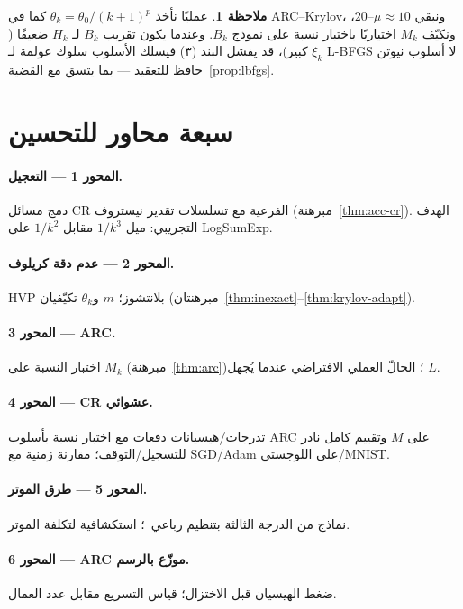 \documentclass[11pt,a4paper]{article}
\theoremstyle{plain}
\theoremstyle{definition}
\newtheorem{remark}[theorem]{ملاحظة}
\begin{document}
\begin{remark}
\label{rem:mf-qn-practice}
عمليًا نأخذ $\theta_{k}=\theta_{0}/(k+1)^{p}$ كما في ARC--Krylov، ونبقي $\mu\approx 10$--$20$، ونكيّف $M_{k}$ اختياريًا باختبار نسبة على نموذج $B_{k}$.
وعندما يكون تقريب $B_{k}$ لـ $H_{k}$ ضعيفًا ( $\xi_{k}$ كبير)، قد يفشل البند (٣) فيسلك الأسلوب سلوك عولمة لـ L-BFGS لا أسلوب نيوتن حافظ للتعقيد --- بما يتسق مع القضية~\ref{prop:lbfgs}.
\end{remark}

\section{سبعة محاور للتحسين}
\label{sec:axes}

\paragraph{المحور 1 --- التعجيل.}
دمج مسائل CR الفرعية مع تسلسلات تقدير نيستروف (مبرهنة~\ref{thm:acc-cr}). الهدف التجريبي: ميل $1/k^{3}$ مقابل $1/k^{2}$ على LogSumExp.

\paragraph{المحور 2 --- عدم دقة كريلوف.}
HVP بلانتشوز؛ $m$ و$\theta_{k}$ تكيّفيان (مبرهنتان~\ref{thm:inexact}--\ref{thm:krylov-adapt}).

\paragraph{المحور 3 --- ARC.}
اختبار النسبة على $M_{k}$ (مبرهنة~\ref{thm:arc})؛ الحالّ العملي الافتراضي عندما يُجهل $L$.

\paragraph{المحور 4 --- CR عشوائي.}
تدرجات/هيسيانات دفعات مع اختبار نسبة بأسلوب ARC على $M$ وتقييم كامل نادر للتسجيل/التوقف؛ مقارنة زمنية مع SGD/Adam على اللوجستي/MNIST.

\paragraph{المحور 5 --- طرق الموتر.}
نماذج من الدرجة الثالثة بتنظيم رباعي~\cite{nesterov2021implementable}؛ استكشافية لتكلفة الموتر.

\paragraph{المحور 6 --- ARC موزّع بالرسم.}
ضغط الهيسيان قبل الاختزال؛ قياس التسريع مقابل عدد العمال.
\end{document}
